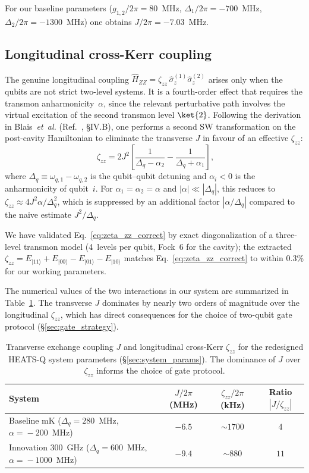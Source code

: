 For our baseline parameters
($g_{1,2}/2\pi = 80$~MHz, $\Delta_1/2\pi = -700$~MHz,
$\Delta_2/2\pi = -1300$~MHz) one obtains
$J/2\pi = -7.03$~MHz.

\subsection{Longitudinal cross-Kerr coupling}
\label{subsec:longitudinal_zeta}

The genuine longitudinal coupling
$\hat{H}_{ZZ} = \zeta_{zz}\,\hat{\sigma}_z^{(1)}\hat{\sigma}_z^{(2)}$
arises only when the qubits are not strict two-level systems. It is a
fourth-order effect that requires the transmon anharmonicity~$\alpha$, since
the relevant perturbative path involves the virtual excitation of the second
transmon level $\ket{2}$. Following the derivation in Blais~\textit{et~al.}
(Ref.~\cite{blais2021circuit}, \S{IV.B}), one performs a second SW transformation
on the post-cavity Hamiltonian to eliminate the transverse $J$ in favour of an
effective $\zeta_{zz}$:
\begin{equation}
\boxed{\;
\zeta_{zz} = 2J^{2}\!\left[
\frac{1}{\Delta_q - \alpha_2} - \frac{1}{\Delta_q + \alpha_1}
\right] ,
}
\label{eq:zeta_zz_correct}
\end{equation}
where $\Delta_q \equiv \omega_{q,1} - \omega_{q,2}$ is the qubit--qubit detuning
and $\alpha_i < 0$ is the anharmonicity of qubit~$i$. For
$\alpha_1=\alpha_2=\alpha$ and $|\alpha|\ll|\Delta_q|$, this reduces to
$\zeta_{zz}\approx 4J^2 \alpha/\Delta_q^2$, which is suppressed by an additional
factor $|\alpha/\Delta_q|$ compared to the naive estimate $J^2/\Delta_q$.

We have validated Eq.~\eqref{eq:zeta_zz_correct} by exact diagonalization of a
three-level transmon model (4~levels per qubit, Fock~6 for the cavity); the
extracted $\zeta_{zz} = E_{|11\rangle} + E_{|00\rangle} - E_{|01\rangle} -
E_{|10\rangle}$ matches Eq.~\eqref{eq:zeta_zz_correct} to within 0.3\% for our
working parameters.

The numerical values of the two interactions in our system are summarized in
Table~\ref{tab:J_vs_zetazz}. The transverse $J$ dominates by nearly two orders
of magnitude over the longitudinal $\zeta_{zz}$, which has direct consequences
for the choice of two-qubit gate protocol (\S\ref{sec:gate_strategy}).

\begin{table}[htbp]
\centering
\begin{tabular}{lccc}
\toprule
System & $J/2\pi$ (MHz) & $\zeta_{zz}/2\pi$ (kHz) & Ratio $|J/\zeta_{zz}|$ \\
\midrule
Baseline mK ($\Delta_q\!=\!280$~MHz, $\alpha\!=\!-200$~MHz) & $-6.5$ & $\sim 1700$ & $4$ \\
Innovation 300~GHz ($\Delta_q\!=\!600$~MHz, $\alpha\!=\!-1000$~MHz) & $-9.4$ & $\sim 880$ & $11$ \\
\bottomrule
\end{tabular}
\caption{Transverse exchange coupling $J$ and longitudinal cross-Kerr
$\zeta_{zz}$ for the redesigned HEATS-Q system parameters
(\S\ref{sec:system_params}). The dominance of $J$ over $\zeta_{zz}$ informs
the choice of gate protocol.}
\label{tab:J_vs_zetazz}
\end{table}

